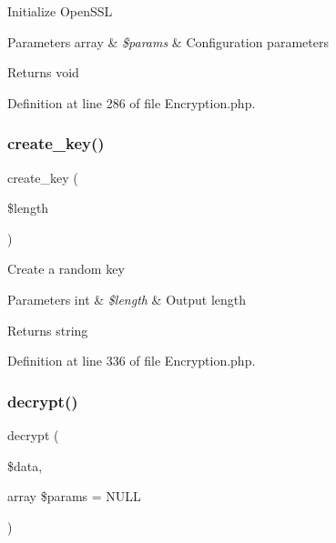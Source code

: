Initialize Open\+S\+SL


\begin{DoxyParams}[1]{Parameters}
array & {\em \$params} & Configuration parameters \\
\hline
\end{DoxyParams}
\begin{DoxyReturn}{Returns}
void 
\end{DoxyReturn}


Definition at line 286 of file Encryption.\+php.

\mbox{\label{class_c_i___encryption_a153c5db947db0e572680ed82519cf27e}} 
\subsubsection{\texorpdfstring{create\_key()}{create\_key()}}
{\footnotesize\ttfamily create\+\_\+key (\begin{DoxyParamCaption}\item[{}]{\$length }\end{DoxyParamCaption})}

Create a random key


\begin{DoxyParams}[1]{Parameters}
int & {\em \$length} & Output length \\
\hline
\end{DoxyParams}
\begin{DoxyReturn}{Returns}
string 
\end{DoxyReturn}


Definition at line 336 of file Encryption.\+php.

\mbox{\label{class_c_i___encryption_a5f379806ec38a79a6be1dc350b07699a}} 
\subsubsection{\texorpdfstring{decrypt()}{decrypt()}}
{\footnotesize\ttfamily decrypt (\begin{DoxyParamCaption}\item[{}]{\$data,  }\item[{array}]{\$params = {\ttfamily NULL} }\end{DoxyParamCaption})}

